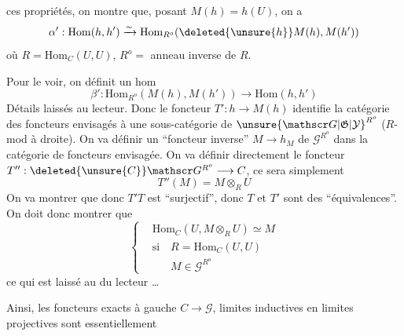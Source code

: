 ces propriétés, on montre que, posant $M(h)=h(U)$, on  a
\[
 \alpha':\mathrm{Hom}(h,h')\xrightarrow{\sim}\mathrm{Hom}_{R^o}(\deleted{\unsure{h}}M(h),M(h'))
\]
où $R=\mathrm{Hom}_C(U,U)$, $R^o=$ anneau inverse de $R$.

Pour le voir, on définit un hom
\[
 \beta':\mathrm{Hom}_{R^o}(M(h),M(h'))\longrightarrow\mathrm{Hom}(h,h')
\]
Détails laissés au lecteur. Donc le foncteur $T':h\longrightarrow M(h)$ identifie la catégorie des foncteurs  envisagés à une sous-catégorie de $\unsure{\mathscr G|\mathfrak G|\mathcal Y}^{R^o}$ ($R$-mod à droite). On va définir un ``foncteur inverse'' $M\longrightarrow h_M$ de $\mathscr G^{R^o}$ dans la catégorie de foncteurs envisagée. On va définir directement le foncteur $T'':\deleted{\unsure{C}}\mathscr G^{R^o}\longrightarrow C$, ce sera simplement
\[
 T''(M)=M\otimes_R U
\]
On va montrer que   donc $T'T$ est ``surjectif'', donc $T$ et $T'$ sont des ``équivalences''. On doit donc montrer que
\[
 \left\{\begin{aligned}
 &\mathrm{Hom}_C(U,M\otimes_R U)\simeq M\\
 &\text{si}\quad R=\mathrm{Hom}_C(U,U)\\
 &\phantom{\text{si}\quad} M\in\mathscr G^{R^o}
 \end{aligned}\right.
\]
ce qui est laissé au  du lecteur \ldots

 Ainsi, les foncteurs   exacts à gauche $C\longrightarrow\mathscr G$,  limites inductives en limites projectives sont essentiellement 
